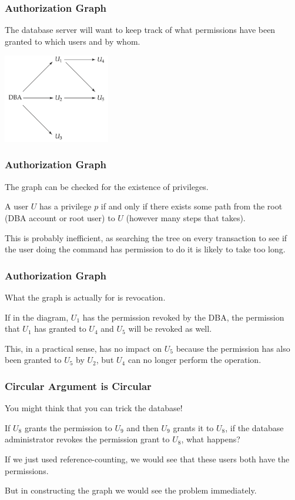 \begin{frame}
\frametitle{Authorization Graph}
The database server will want to keep track of what permissions have been granted to which users and by whom.

\begin{center}
\includegraphics[width=0.35\textwidth]{images/auth-graph}
\end{center}

\end{frame}


\begin{frame}
\frametitle{Authorization Graph}

The graph can be checked for the existence of privileges. 

A user $U$ has a privilege $p$ if and only if there exists some path from the root (DBA account or root user) to $U$ (however many steps that takes). 

This is probably inefficient, as searching the tree on every transaction to see if the user doing the command has permission to do it is likely to take too long. 


\end{frame}



\begin{frame}
\frametitle{Authorization Graph}

What the graph is actually for is revocation. 

If in the diagram, $U_{1}$ has the permission revoked by the DBA, the permission that $U_{1}$ has granted to $U_{4}$ and $U_{5}$ will be revoked as well. 

This, in a practical sense, has no impact on $U_{5}$ because the permission has also been granted to $U_{5}$ by $U_{2}$, but $U_{4}$ can no longer perform the operation.


\end{frame}



\begin{frame}
\frametitle{Circular Argument is Circular}

You might think that you can trick the database! 

If $U_{8}$ grants the permission to $U_{9}$ and then $U_{9}$ grants it to $U_{8}$, if the database administrator revokes the permission grant to $U_{8}$, what happens? 

If we just used reference-counting, we would see that these users both have the permissions. 

But in constructing the graph we would see the problem immediately.

\end{frame}




